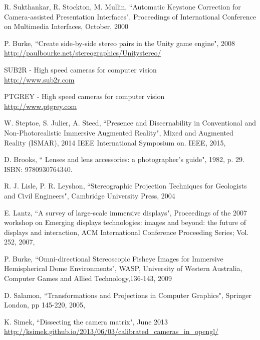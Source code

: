 \begin{thebibliography}{99}
R. Sukthankar, R. Stockton, M. Mullin,
``Automatic Keystone Correction for Camera-assisted Presentation Interfaces",
Proceedings of International Conference on Multimedia Interfaces,
October, 2000

P. Burke,
``Create side-by-side stereo pairs in the Unity game engine", 2008 \\ \href{http://paulbourke.net/stereographics/Unitystereo/}{http://paulbourke.net/stereographics/Unitystereo/}


SUB2R - High speed cameras for computer vision \\ \href{http://www.sub2r.com}{http://www.sub2r.com}

PTGREY - High speed cameras for computer vision \\ \href{http://www.ptgrey.com}{http://www.ptgrey.com}

W. Steptoe, S. Julier, A. Steed,
``Presence and Discernability in Conventional and Non-Photorealistic Immersive Augmented Reality",
Mixed and Augmented Reality (ISMAR), 2014 IEEE International Symposium on. IEEE, 2015,




D. Brooks,
`` Lenses and lens accessories: a photographer's guide", 1982, p. 29. \\ISBN: 9780930764340.

R. J. Lisle, P. R. Leyshon,
``Stereographic Projection Techniques for Geologists and Civil Engineers",
Cambridge University Press, 2004

E. Lantz, 
``A survey of large-scale immersive displays", Proceedings of the 2007 workshop on Emerging displays technologies: images and beyond: the future of displays and interaction, ACM International Conference Proceeding Series; Vol. 252, 2007,

P. Burke,
``Omni-directional Stereoscopic Fisheye Images for Immersive Hemispherical Dome Environments",
WASP, University of Western Australia, Computer Games and Allied Technology,136-143, 2009

D. Salamon, 
``Transformations and Projections in Computer Graphics", Springer London, pp 145-220, 2005,


K. Simek, ``Dissecting the camera matrix", June 2013\\ \href{http://ksimek.github.io/2013/06/03/calibrated\_cameras\_in\_opengl/}{http://ksimek.github.io/2013/06/03/calibrated\_cameras\_in\_opengl/}



\end{thebibliography}

